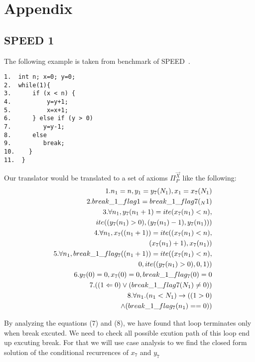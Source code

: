 \section{Appendix}
\label{sec:appendix}

\subsection{SPEED 1}

The following example is taken from benchmark of SPEED~\cite{speed1}.
\begin{verbatim}
1.  int n; x=0; y=0;
2.  while(1){
3.      if (x < n) { 
4.          y=y+1;
5.          x=x+1; 
6.      } else if (y > 0)
7.         y=y-1;
8.      else 
9.         break;
10.    }
11.  }
\end{verbatim}



Our translator would be translated to a set of axioms $\Pi_P^{\vec{X}}$ like the following:
\begin{eqnarray*}
	&&1. n_1 = n, y_1 = y_7(N_1), x_1 = x_7(N_1)\\
	&&2.break\_1\_flag1 = break\_1\_flag7(_N1)\\
	&&3.\forall n_1,y_7(n_1+1) = ite(x_7(n_1)<n),\\ &&\hspace*{2em}ite((y_7(n_1)>0),(y_7(n_1)-1),y_7(n_1)))\\ 
	&&4.\forall n_1,x_7((n_1+1)) = ite((x_7(n_1)<n),\\ &&\hspace*{2em}(x_7(n_1)+1),x_7(n_1))\\ 
	&&5.\forall n_1,break\_1\_flag_7((n_1+1)) = ite((x_7(n_1)<n),\\ &&\hspace*{2em}0,ite((y_7(n_1)>0),0,1))\\
	&&6.y_7(0) = 0, x_7(0) = 0, break\_1\_flag_7(0) = 0\\
	&&7.((1<=0) \lor (break\_1\_flag7(N_1)\not=0))\\
	&&8.\forall n_1.(n_1<N_1) \rightarrow ((1>0)\\
	&&\hspace*{4em} \land (break\_1\_flag_7(n_1)==0))
\end{eqnarray*}



By analyzing the equations (7) and (8), we have found that loop terminates only when break excuted. We need to check all possible exution path of this loop end up excuting break. For that we will use case analysis to we find the closed form solution of the conditional recurrences of $x_7$ and $y_7$

